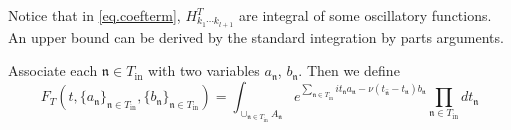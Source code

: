 Notice that in \eqref{eq.coefterm}, $H^T_{k_1\cdots k_{l+1}}$ are integral of some oscillatory functions. An upper bound can be derived by the standard integration by parts arguments.

Associate each $\mathfrak{n}\in T_{\text{in}}$ with two variables $a_{\mathfrak{n}}$, $b_{\mathfrak{n}}$. Then we define
\begin{equation}\label{eq.defF_T}
F_{T}(t,\{a_{\mathfrak{n}}\}_{\mathfrak{n}\in T_{\text{in}}},\{b_{\mathfrak{n}}\}_{\mathfrak{n}\in T_{\text{in}}})=\int_{\cup_{\mathfrak{n}\in T_{\text{in}}} A_{\mathfrak{n}}} e^{\sum_{\mathfrak{n}\in T_{\text{in}}} it_{\mathfrak{n}} a_{\mathfrak{n}} - \nu(t_{\widehat{\mathfrak{n}}}-t_{\mathfrak{n}})b_{\mathfrak{n}}} \prod_{\mathfrak{n}\in T_{\text{in}}} dt_{\mathfrak{n}} 
\end{equation}

